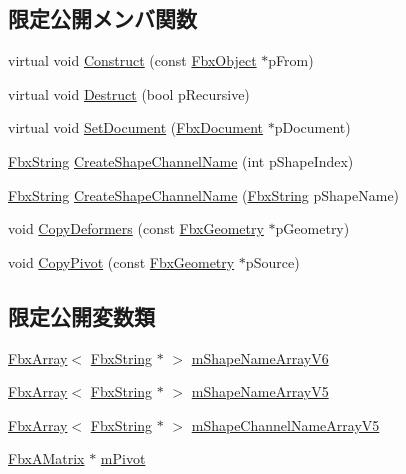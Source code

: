 \subsection*{限定公開メンバ関数}
\begin{DoxyCompactItemize}
\item 
virtual void \hyperlink{class_fbx_geometry_a26ca96a86f17783c45ff83b33d2b5324}{Construct} (const \hyperlink{class_fbx_object}{Fbx\+Object} $\ast$p\+From)
\item 
virtual void \hyperlink{class_fbx_geometry_a07e94f7801067d66429afbf1799795cd}{Destruct} (bool p\+Recursive)
\item 
virtual void \hyperlink{class_fbx_geometry_a4e28b47a5f6dba7d53e692486d69c126}{Set\+Document} (\hyperlink{class_fbx_document}{Fbx\+Document} $\ast$p\+Document)
\item 
\hyperlink{class_fbx_string}{Fbx\+String} \hyperlink{class_fbx_geometry_ad79e9244da135a8fd62e47932ea68112}{Create\+Shape\+Channel\+Name} (int p\+Shape\+Index)
\item 
\hyperlink{class_fbx_string}{Fbx\+String} \hyperlink{class_fbx_geometry_a0f8e33ca5bf929614ffba6893079c136}{Create\+Shape\+Channel\+Name} (\hyperlink{class_fbx_string}{Fbx\+String} p\+Shape\+Name)
\item 
void \hyperlink{class_fbx_geometry_a0fa8343b20fb5a9c0b0bc15a83967972}{Copy\+Deformers} (const \hyperlink{class_fbx_geometry}{Fbx\+Geometry} $\ast$p\+Geometry)
\item 
void \hyperlink{class_fbx_geometry_a97edd8b50b825e220a2c246936480160}{Copy\+Pivot} (const \hyperlink{class_fbx_geometry}{Fbx\+Geometry} $\ast$p\+Source)
\end{DoxyCompactItemize}
\subsection*{限定公開変数類}
\begin{DoxyCompactItemize}
\item 
\hyperlink{class_fbx_array}{Fbx\+Array}$<$ \hyperlink{class_fbx_string}{Fbx\+String} $\ast$ $>$ \hyperlink{class_fbx_geometry_a7f09646b7a716f58932d9be9c4a34486}{m\+Shape\+Name\+Array\+V6}
\item 
\hyperlink{class_fbx_array}{Fbx\+Array}$<$ \hyperlink{class_fbx_string}{Fbx\+String} $\ast$ $>$ \hyperlink{class_fbx_geometry_a2a38009f990f6dfa9ca81ee2b24b024b}{m\+Shape\+Name\+Array\+V5}
\item 
\hyperlink{class_fbx_array}{Fbx\+Array}$<$ \hyperlink{class_fbx_string}{Fbx\+String} $\ast$ $>$ \hyperlink{class_fbx_geometry_a8752a5800b261d678592dc7a81dad4b0}{m\+Shape\+Channel\+Name\+Array\+V5}
\item 
\hyperlink{class_fbx_a_matrix}{Fbx\+A\+Matrix} $\ast$ \hyperlink{class_fbx_geometry_ab9f5852d38a38a9efb0ab63bd74503c0}{m\+Pivot}
\end{DoxyCompactItemize}
